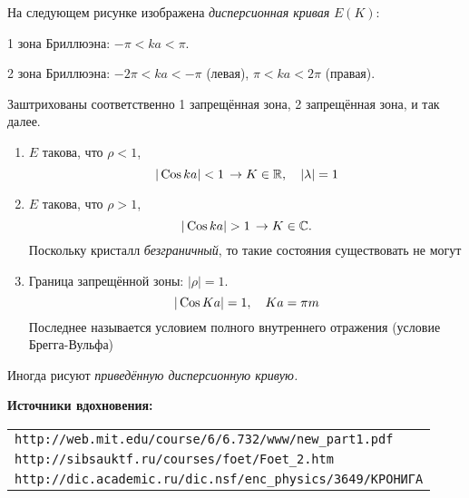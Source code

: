 На следующем рисунке изображена \emph{дисперсионная кривая} $E(K)$:

1 зона Бриллюэна: $-\pi < ka < \pi$.

2 зона Бриллюэна: $-2\pi < ka < -\pi$ (левая), $\pi < ka < 2\pi$ (правая).

Заштрихованы соответственно 1 запрещённая зона, 2 запрещённая зона, и так далее.

\begin{enumerate}
  \item $E$ такова, что $\rho < 1$,
  $$
    |\,\mathrm {Cos} \, ka| < 1 \, \to K \in \mathbb {R}, \quad |\lambda| = 1
  $$
  \item $E$ такова, что $\rho > 1$,
  $$
    |\,\mathrm {Cos} \, ka| > 1 \, \to K \in \mathbb {C}.
  $$
  Поскольку кристалл \emph{безграничный}, то такие состояния существовать не могут
  \item Граница запрещённой зоны: $|\rho| = 1$.
  $$
    |\,\mathrm {Cos} \, Ka| = 1, \quad Ka = \pi m
  $$
  Последнее называется условием полного внутреннего отражения (условие Брегга-Вульфа)
\end{enumerate}

\Rem Иногда рисуют \emph{приведённую дисперсионную кривую.}

\textbf{Источники вдохновения:}
\begin{tabular}{l}
  \texttt{http://web.mit.edu/course/6/6.732/www/new\_part1.pdf} \\
  \texttt{http://sibsauktf.ru/courses/foet/Foet\_2.htm} \\
  \texttt{http://dic.academic.ru/dic.nsf/enc\_physics/3649/КРОНИГА}  \\
\end{tabular}


